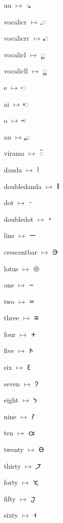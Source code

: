 {\noindent uu $\mapsto$ {\brfont 𑀽}\par
\noindent vocalicr $\mapsto$ {\brfont 𑀾}\par
\noindent vocalicrr $\mapsto$ {\brfont 𑀿}\par
\noindent vocalicl $\mapsto$ {\brfont 𑁀}\par
\noindent vocalicll $\mapsto$ {\brfont 𑁁}\par
\noindent e $\mapsto$ {\brfont 𑁂}\par
\noindent ai $\mapsto$ {\brfont 𑁃}\par
\noindent o $\mapsto$ {\brfont 𑁄}\par
\noindent au $\mapsto$ {\brfont 𑁅}\par
\noindent virama $\mapsto$ {\brfont 𑁆}\par
\noindent danda $\mapsto$ {\brfont 𑁇}\par
\noindent doubledanda $\mapsto$ {\brfont 𑁈}\par
\noindent dot $\mapsto$ {\brfont 𑁉}\par
\noindent doubledot $\mapsto$ {\brfont 𑁊}\par
\noindent line $\mapsto$ {\brfont 𑁋}\par
\noindent crescentbar $\mapsto$ {\brfont 𑁌}\par
\noindent lotus $\mapsto$ {\brfont 𑁍}\par
\noindent one $\mapsto$ {\brfont 𑁒}\par
\noindent two $\mapsto$ {\brfont 𑁓}\par
\noindent three $\mapsto$ {\brfont 𑁔}\par
\noindent four $\mapsto$ {\brfont 𑁕}\par
\noindent five $\mapsto$ {\brfont 𑁖}\par
\noindent six $\mapsto$ {\brfont 𑁗}\par
\noindent seven $\mapsto$ {\brfont 𑁘}\par
\noindent eight $\mapsto$ {\brfont 𑁙}\par
\noindent nine $\mapsto$ {\brfont 𑁚}\par
\noindent ten $\mapsto$ {\brfont 𑁛}\par
\noindent twenty $\mapsto$ {\brfont 𑁜}\par
\noindent thirty $\mapsto$ {\brfont 𑁝}\par
\noindent forty $\mapsto$ {\brfont 𑁞}\par
\noindent fifty $\mapsto$ {\brfont 𑁟}\par
\noindent sixty $\mapsto$ {\brfont 𑁠}\par
}

